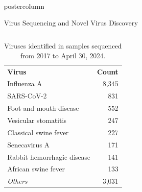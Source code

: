 \documentclass[final]{beamer}
\begin{document}
\begin{frame}
\begin{columns}
\begin{column}{.5\textwidth}
\begin{beamercolorbox}[center,wd=\textwidth]{postercolumn}
\begin{minipage}[T]{.95\textwidth}
{  %
  \begin{block}{Virus Sequencing and Novel Virus Discovery}
    \begin{columns}
    \begin{column}{.26\textwidth}
      \parbox[t]{\textwidth}{
      \begin{table}
      \caption{Viruses identified in samples sequenced from 2017 to April 30, 2024.}
      \begin{tabular}{l r}
      \textbf{Virus} & \textbf{Count} \\
      Influenza A & 8,345 \\
      SARS-CoV-2 & 831 \\
      Foot-and-mouth-disease & 552 \\
      Vesicular stomatitis & 247 \\
      Classical swine fever & 227 \\
      Senecavirus A & 171 \\
      Rabbit hemorrhagic disease & 141 \\
      African swine fever & 133 \\
      \emph{Others} & 3,031 \\
      \end{tabular}
      

\end{table}}
\end{column}
\end{columns}
\end{block}}
\end{minipage}
\end{beamercolorbox}
\end{column}
\end{columns}
\end{frame}
\end{document}
